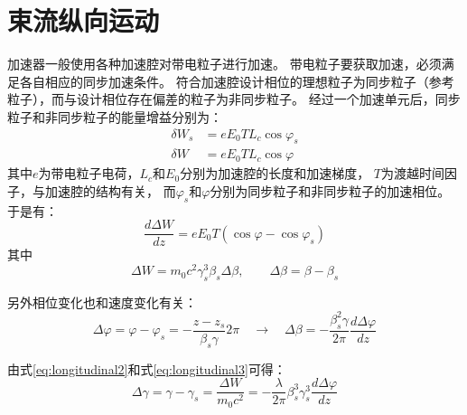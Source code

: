 \section{束流纵向运动}
加速器一般使用各种加速腔对带电粒子进行加速。
带电粒子要获取加速，必须满足各自相应的同步加速条件。
符合加速腔设计相位的理想粒子为同步粒子（参考粒子），而与设计相位存在偏差的粒子为非同步粒子。
经过一个加速单元后，同步粒子和非同步粒子的能量增益分别为：
\begin{equation}
    \label{eq:longitudinal1}
    \begin{aligned}
        \delta W_s &= e E_0 T L_c \cos {\varphi}_s \\
        \delta W   &= e E_0 T L_c \cos {\varphi}
    \end{aligned}
\end{equation}
其中$e$为带电粒子电荷，$L_c$和$E_0$分别为加速腔的长度和加速梯度，
$T$为渡越时间因子，与加速腔的结构有关，
而${\varphi}_s$和${\varphi}$分别为同步粒子和非同步粒子的加速相位。于是有：
\begin{equation}
    \label{eq:longitudinal2}
        \frac{d\Delta W}{dz} = e E_0 T (\cos {\varphi} - \cos {\varphi}_s)
\end{equation}
其中
\begin{equation}
    \label{eq:longitudinal2_cont}
        \Delta W = m_0 c^2 {\gamma}_s^3 {\beta}_s \Delta \beta, \qquad \Delta \beta = \beta - {\beta}_s
\end{equation}

另外相位变化也和速度变化有关：
\begin{equation}
    \label{eq:longitudinal3}
        \Delta \varphi = \varphi - {\varphi}_s = -\frac{z-z_s}{\beta _s \gamma} 2\pi
        \quad \rightarrow \quad
        \Delta \beta = - \frac{\beta_s^2 \gamma}{2\pi} \frac{d \Delta \varphi}{dz}
\end{equation}

由式\ref{eq:longitudinal2}和式\ref{eq:longitudinal3}可得：
\begin{equation}
    \label{eq:longitudinal4}
        \Delta \gamma = \gamma - \gamma _s
                = \frac{\Delta W}{m_0 c^2}
                = -\frac{\lambda}{2\pi} \beta_s^3 \gamma_s^3 \frac{d\Delta \varphi}{dz}
\end{equation}

